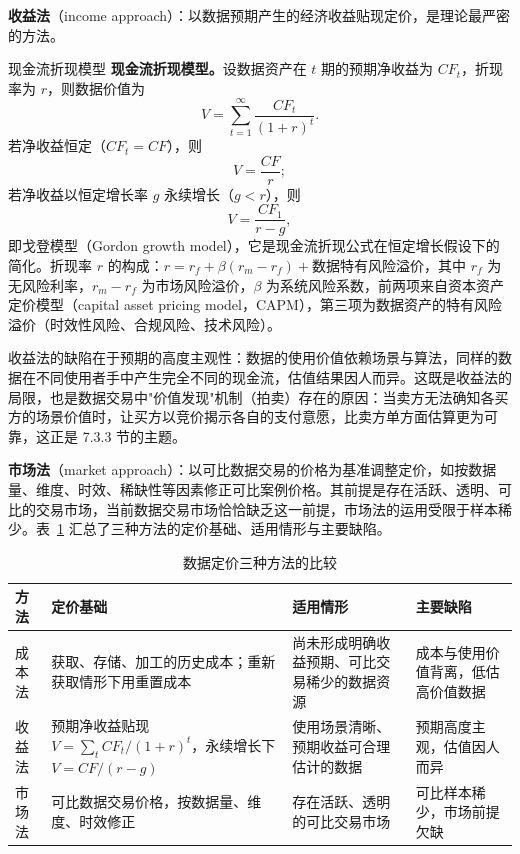\textbf{收益法}（income approach）：以数据预期产生的经济收益贴现定价，是理论最严密的方法。

\begin{derivation}{现金流折现模型}{}
\textbf{现金流折现模型。}设数据资产在 $t$ 期的预期净收益为 $CF_t$，折现率为 $r$，则数据价值为
\[
V = \sum_{t=1}^{\infty} \frac{CF_t}{(1+r)^t}.
\]
若净收益恒定（$CF_t = CF$），则
\[
V = \frac{CF}{r};
\]
若净收益以恒定增长率 $g$ 永续增长（$g < r$），则
\[
V = \frac{CF_1}{r - g},
\]
即戈登模型（Gordon growth model），它是现金流折现公式在恒定增长假设下的简化。折现率 $r$ 的构成：$r = r_f + \beta(r_m - r_f) + \text{数据特有风险溢价}$，其中 $r_f$ 为无风险利率，$r_m - r_f$ 为市场风险溢价，$\beta$ 为系统风险系数，前两项来自资本资产定价模型（capital asset pricing model，CAPM），第三项为数据资产的特有风险溢价（时效性风险、合规风险、技术风险）。
\end{derivation}

收益法的缺陷在于预期的高度主观性：数据的使用价值依赖场景与算法，同样的数据在不同使用者手中产生完全不同的现金流，估值结果因人而异。这既是收益法的局限，也是数据交易中"价值发现"机制（拍卖）存在的原因：当卖方无法确知各买方的场景价值时，让买方以竞价揭示各自的支付意愿，比卖方单方面估算更为可靠，这正是 7.3.3 节的主题。

\textbf{市场法}（market approach）：以可比数据交易的价格为基准调整定价，如按数据量、维度、时效、稀缺性等因素修正可比案例价格。其前提是存在活跃、透明、可比的交易市场，当前数据交易市场恰恰缺乏这一前提，市场法的运用受限于样本稀少。表~\ref{tab:pricing} 汇总了三种方法的定价基础、适用情形与主要缺陷。

\begin{table}[htbp]
\centering
\setlength{\tabcolsep}{4pt}
\caption{数据定价三种方法的比较}
\label{tab:pricing}
\begin{tabular}{p{1.3cm}p{4.5cm}p{3.1cm}p{3.1cm}}
\hline
\textbf{方法} & \textbf{定价基础} & \textbf{适用情形} & \textbf{主要缺陷} \\
\hline
成本法 & 获取、存储、加工的历史成本；重新获取情形下用重置成本 & 尚未形成明确收益预期、可比交易稀少的数据资源 & 成本与使用价值背离，低估高价值数据 \\
收益法 & 预期净收益贴现 $V=\sum_{t} CF_t/(1+r)^t$，永续增长下 $V=CF/(r-g)$ & 使用场景清晰、预期收益可合理估计的数据 & 预期高度主观，估值因人而异 \\
市场法 & 可比数据交易价格，按数据量、维度、时效修正 & 存在活跃、透明的可比交易市场 & 可比样本稀少，市场前提欠缺 \\
\hline
\end{tabular}
\end{table}

